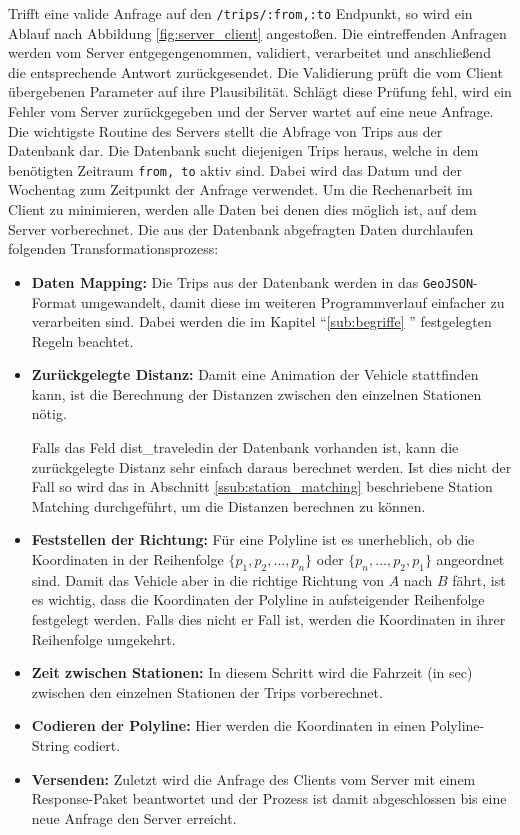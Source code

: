   Trifft eine valide Anfrage auf den \texttt{/trips/:from,:to} Endpunkt, so wird ein Ablauf nach Abbildung \ref{fig:server_client} angestoßen.
  Die eintreffenden Anfragen werden vom Server entgegengenommen, validiert, verarbeitet und anschließend die entsprechende Antwort zurückgesendet. Die Validierung prüft die vom Client übergebenen Parameter auf ihre Plausibilität. Schlägt diese Prüfung fehl, wird ein Fehler vom Server zurückgegeben und der Server wartet auf eine neue Anfrage. Die wichtigste Routine des Servers stellt die Abfrage von Trips aus der Datenbank dar. Die Datenbank sucht diejenigen Trips heraus, welche in dem benötigten Zeitraum \texttt{from, to} aktiv sind. Dabei wird das Datum und der Wochentag zum Zeitpunkt der Anfrage verwendet. Um die Rechenarbeit im Client zu minimieren, werden alle Daten bei denen dies möglich ist, auf dem Server vorberechnet. Die aus der Datenbank abgefragten Daten durchlaufen folgenden Transformationsprozess:

  \begin{itemize}
    \item \textbf{Daten Mapping:} Die Trips aus der Datenbank werden in das \texttt{GeoJSON}-Format umgewandelt, damit diese im weiteren Programmverlauf einfacher zu verarbeiten sind. Dabei werden die im Kapitel "`\ref{sub:begriffe} "' festgelegten Regeln beachtet.

    \item \textbf{Zurückgelegte Distanz:} Damit eine Animation der Vehicle stattfinden kann, ist die Berechnung der Distanzen zwischen den einzelnen Stationen nötig. 

    Falls das Feld dist\_traveled\footnotemark in der Datenbank vorhanden ist, kann die zurückgelegte Distanz sehr einfach daraus berechnet werden. Ist dies nicht der Fall so wird das in Abschnitt \ref{ssub:station_matching} beschriebene Station Matching durchgeführt, um die Distanzen berechnen zu können.

    \item \textbf{Feststellen der Richtung:} Für eine Polyline ist es unerheblich, ob die Koordinaten in der Reihenfolge $\{ p_1, p_2, \dotsc, p_n \}$ oder $\{ p_n, \dotsc, p_2, p_1 \}$ angeordnet sind. Damit das Vehicle aber in die richtige Richtung von $A$ nach $B$ fährt, ist es wichtig, dass die Koordinaten der Polyline in aufsteigender Reihenfolge festgelegt werden. Falls dies nicht er Fall ist, werden die Koordinaten in ihrer Reihenfolge umgekehrt.

    \item \textbf{Zeit zwischen Stationen:} In diesem Schritt wird die Fahrzeit (in sec) zwischen den einzelnen Stationen der Trips vorberechnet.

    \item \textbf{Codieren der Polyline:} Hier werden die Koordinaten in einen Polyline-String codiert.

    \item \textbf{Versenden:} Zuletzt wird die Anfrage des Clients vom Server mit einem Response-Paket beantwortet und der Prozess ist damit abgeschlossen bis eine neue Anfrage den Server erreicht.
  \end{itemize}
    
